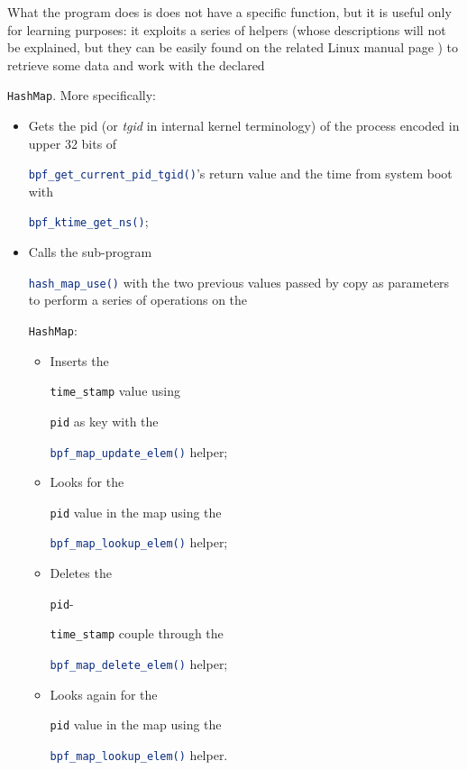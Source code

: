 What the program does is does not have a specific function, but it is useful only for learning purposes: it exploits a series of helpers (whose descriptions will not be explained, but they can be easily found on the related Linux manual page \cite{LinuxHelpers}) to retrieve some data and work with the declared \raggedright\colorbox{backcolour}{\lstinline[style=commandline, language=bash]|HashMap|}.
More specifically:

\begin{itemize}
	\item 
		Gets the pid (or \textit{tgid} in internal kernel terminology) of the process encoded in upper 32 bits of \raggedright\colorbox{backcolour}{\lstinline[style=commandline, language=bash]|bpf_get_current_pid_tgid()|}'s return value and the time from system boot with \raggedright\colorbox{backcolour}{\lstinline[style=commandline, language=bash]|bpf_ktime_get_ns()|};
	\item 
		Calls the sub-program \raggedright\colorbox{backcolour}{\lstinline[style=commandline, language=bash]|hash_map_use()|} with the two previous values passed by copy as parameters to perform a series of operations on the \raggedright\colorbox{backcolour}{\lstinline[style=commandline, language=bash]|HashMap|}:
		\begin{itemize}
			\item 
				Inserts the \raggedright\colorbox{backcolour}{\lstinline[style=commandline, language=bash]|time_stamp|} value using \raggedright\colorbox{backcolour}{\lstinline[style=commandline, language=bash]|pid|} as key with the \raggedright\colorbox{backcolour}{\lstinline[style=commandline, language=bash]|bpf_map_update_elem()|} helper;
			\item 
				Looks for the \raggedright\colorbox{backcolour}{\lstinline[style=commandline, language=bash]|pid|} value in the map using the \raggedright\colorbox{backcolour}{\lstinline[style=commandline, language=bash]|bpf_map_lookup_elem()|} helper;
			\item 
				Deletes the \raggedright\colorbox{backcolour}{\lstinline[style=commandline, language=bash]|pid|}-\raggedright\colorbox{backcolour}{\lstinline[style=commandline, language=bash]|time_stamp|} couple through the \raggedright\colorbox{backcolour}{\lstinline[style=commandline, language=bash]|bpf_map_delete_elem()|} helper;
			\item 
				Looks again for the \raggedright\colorbox{backcolour}{\lstinline[style=commandline, language=bash]|pid|} value in the map using the \raggedright\colorbox{backcolour}{\lstinline[style=commandline, language=bash]|bpf_map_lookup_elem()|} helper.
		\end{itemize}
\end{itemize}

